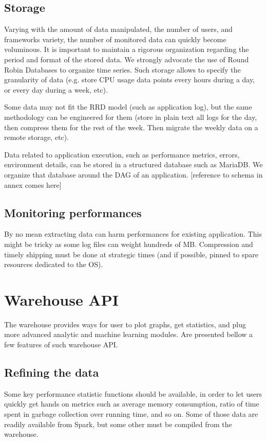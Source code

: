 \documentclass[12pt,twocolumn]{article}
\begin{document}
  \subsection{Storage}
  Varying with the amount of data manipulated, the number of users, and frameworks variety, the
  number of monitored data can quickly become voluminous. It is important to maintain a rigorous
  organization regarding the period and format of the stored data. We strongly advocate the use
  of Round Robin Databases to organize time series. Such storage allows to specify the
  granularity of data (e.g. store CPU usage data points every hours during a day, or every day
  during a week, etc).
  \par
  Some data may not fit the RRD model (such as application log), but the same methodology can be
  engineered for them (store in plain text all logs for the day, then compress them for the rest
  of the week. Then migrate the weekly data on a remote storage, etc).
  \par
  \par
  Data related to application execution, such as performance metrics, errors, environment details,
  can be stored in a structured database such as MariaDB. We organize that database around the DAG
  of an application. [reference to schema in annex comes here]

  \subsection{Monitoring performances}
  By no mean extracting data can harm performances for existing application. This might be tricky
  as some log files can weight hundreds of MB. Compression and timely shipping must be done at
  strategic times (and if possible, pinned to spare resources dedicated to the OS).
  \par
  [In this chapter are described those various techniques]

\section{Warehouse API}
  The warehouse provides ways for user to plot graphs, get statistics, and plug more advanced
  analytic and machine learning modules. Are presented bellow a few features of such warehouse API.

  \subsection{Refining the data}
    Some key performance statistic functions should be available, in order to let users quickly get
    hands on metrics such as average memory consumption, ratio of time spent in garbage collection
    over running time, and so on. Some of those data are readily available from Spark, but some other
    must be compiled from the warehouse. 
\end{document}
